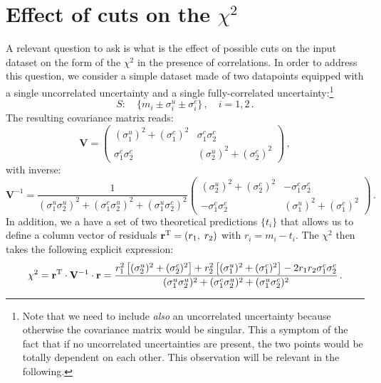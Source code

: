 \documentclass[10pt,a4paper]{article}
\begin{document}
\section{Effect of cuts on the $\chi^2$}

A relevant question to ask is what is the effect of possible cuts on
the input dataset on the form of the $\chi^2$ in the presence of
correlations. In order to address this question, we consider a simple
dataset made of two datapoints equipped with a single uncorrelated
uncertainty and a single fully-correlated uncertainty:\footnote{Note
  that we need to include \textit{also} an uncorrelated uncertainty
  because otherwise the covariance matrix would be singular. This a
  symptom of the fact that if no uncorrelated uncertainties are
  present, the two points would be totally dependent on each
  other. This observation will be relevant in the following.}
\begin{equation}\label{eq:fullset}
S:\quad\{m_i\pm \sigma_i^u\pm \sigma_i^c\}\,,\quad i  =1,2\,.
\end{equation}
The resulting covariance matrix reads:
\begin{equation}
\mathbf{V}=\begin{pmatrix}
(\sigma_1^u)^2+ (\sigma_1^c)^2 & \sigma_1^c \sigma_2^c \\
\sigma_1^c \sigma_2^c & (\sigma_2^u)^2+ (\sigma_2^c)^2
\end{pmatrix}\,,
\end{equation}
with inverse:
\begin{equation}
\mathbf{V}^{-1}=\frac{1}{(\sigma_1^u \sigma_2^u)^2+ (\sigma_1^c \sigma_2^u)^2+ (\sigma_1^u \sigma_2^c)^2}\begin{pmatrix}
(\sigma_2^u)^2+ (\sigma_2^c)^2 & -\sigma_1^c \sigma_2^c \\
-\sigma_1^c \sigma_2^c & (\sigma_1^u)^2+ (\sigma_1^c)^2
\end{pmatrix}\,.
\end{equation}
In addition, we a have a set of two theoretical predictions $\{t_i\}$
that allows us to define a column vector of residuals
$\mathbf{r}^{\rm T}=(r_1,\;r_2)$ with $r_i=m_i-t_i$. The $\chi^2$ then takes
the following explicit expression:
\begin{equation}\label{eq:fullchi2}
  \chi^2= \mathbf{r}^{\rm T}\cdot \mathbf{V}^{-1}\cdot \mathbf{r}=
  \frac{r_1^2\left[(\sigma_2^u)^2+ (\sigma_2^c)^2\right]+r_2^2\left[(\sigma_1^u)^2+ (\sigma_1^c)^2\right]-2 r_1 r_2\sigma_1^c \sigma_2^c}{(\sigma_1^u \sigma_2^u)^2+ (\sigma_1^c \sigma_2^u)^2+ (\sigma_1^u \sigma_2^c)^2}\,.
\end{equation}
\end{document}
